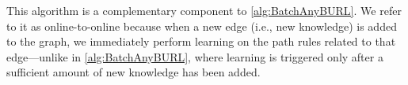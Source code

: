 This algorithm is a complementary component to \autoref{alg:BatchAnyBURL}. We refer to it as online-to-online because when a new edge (i.e., new knowledge) is added to the graph, we immediately perform learning on the path rules related to that edge—unlike in \autoref{alg:BatchAnyBURL}, where learning is triggered only after a sufficient amount of new knowledge has been added.
